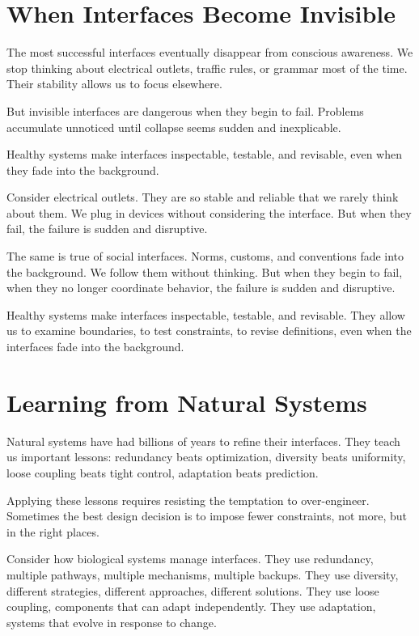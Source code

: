 \documentclass[
  openright]{book}
\begin{document}
\section{When Interfaces Become
Invisible}\label{when-interfaces-become-invisible}

The most successful interfaces eventually disappear from conscious
awareness. We stop thinking about electrical outlets, traffic rules, or
grammar most of the time. Their stability allows us to focus elsewhere.

But invisible interfaces are dangerous when they begin to fail. Problems
accumulate unnoticed until collapse seems sudden and inexplicable.

Healthy systems make interfaces inspectable, testable, and revisable,
even when they fade into the background.

Consider electrical outlets. They are so stable and reliable that we
rarely think about them. We plug in devices without considering the
interface. But when they fail, the failure is sudden and disruptive.

The same is true of social interfaces. Norms, customs, and conventions
fade into the background. We follow them without thinking. But when they
begin to fail, when they no longer coordinate behavior, the failure is
sudden and disruptive.

Healthy systems make interfaces inspectable, testable, and revisable.
They allow us to examine boundaries, to test constraints, to revise
definitions, even when the interfaces fade into the background.

\section{Learning from Natural
Systems}\label{learning-from-natural-systems}

Natural systems have had billions of years to refine their interfaces.
They teach us important lessons: redundancy beats optimization,
diversity beats uniformity, loose coupling beats tight control,
adaptation beats prediction.

Applying these lessons requires resisting the temptation to
over-engineer. Sometimes the best design decision is to impose fewer
constraints, not more, but in the right places.

Consider how biological systems manage interfaces. They use redundancy,
multiple pathways, multiple mechanisms, multiple backups. They use
diversity, different strategies, different approaches, different
solutions. They use loose coupling, components that can adapt
independently. They use adaptation, systems that evolve in response to
change.
\end{document}
